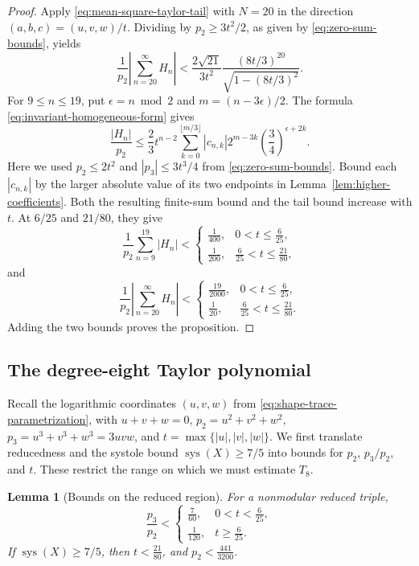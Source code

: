 \documentclass[10pt,twoside]{article}
\theoremstyle{plain}
\newtheorem{lemma}[theorem]{Lemma}
\theoremstyle{definition}
\theoremstyle{remark}
\DeclareMathOperator{\sys}{sys}
\begin{document}
\begin{proof}
Apply \eqref{eq:mean-square-taylor-tail} with $N=20$ in the direction
$(a,b,c)=(u,v,w)/t$. Dividing by $p_2\geq3t^2/2$, as given by
\eqref{eq:zero-sum-bounds}, yields
$$\frac1{p_2}\left|\sum_{n=20}^{\infty}H_n\right|
<\frac{2\sqrt{21}}{3t^2}
\frac{(8t/3)^{20}}{\sqrt{1-(8t/3)^2}}.$$
For $9\leq n\leq19$, put $\epsilon=n\bmod2$ and
$m=(n-3\epsilon)/2$. The formula
\eqref{eq:invariant-homogeneous-form} gives
$$
\frac{|H_n|}{p_2}
\leq\frac23t^{n-2}
\sum_{k=0}^{\lfloor m/3\rfloor}
|c_{n,k}|2^{m-3k}\left(\frac34\right)^{\epsilon+2k}.
$$
Here we used $p_2\leq2t^2$ and
$|p_3|\leq3t^3/4$ from \eqref{eq:zero-sum-bounds}.
Bound each $|c_{n,k}|$ by the larger absolute value of its two
endpoints in Lemma~\ref{lem:higher-coefficients}.
Both the resulting finite-sum bound and the tail bound increase
with $t$. At $6/25$ and $21/80$, they give
$$
\frac1{p_2}\sum_{n=9}^{19}|H_n|<
\begin{cases}
\frac1{400},&0<t\leq\frac6{25},\\
\frac1{200},&\frac6{25}<t\leq\frac{21}{80},
\end{cases}
$$
and
$$
\frac1{p_2}\left|\sum_{n=20}^{\infty}H_n\right|
<
\begin{cases}
\frac{19}{2000},&0<t\leq\frac6{25},\\
\frac1{20},&\frac6{25}<t\leq\frac{21}{80}.
\end{cases}
$$
Adding the two bounds proves the proposition.
\end{proof}

\subsection{The degree-eight Taylor polynomial}
\label{sec:invariant-reduction}
Recall the logarithmic coordinates $(u,v,w)$ from
\eqref{eq:shape-trace-parametrization}, with $u+v+w=0$,
$p_2=u^2+v^2+w^2$, $p_3=u^3+v^3+w^3=3uvw$, and
$t=\max\{|u|,|v|,|w|\}$. We first translate reducedness and the
systole bound $\sys(X)\geq7/5$ into bounds for $p_2$, $p_3/p_2$,
and $t$. These restrict the range on which we must estimate $T_8$.

\begin{lemma}[Bounds on the reduced region]
\label{lem:reduced-invariants}
For a nonmodular reduced triple,
$$
\frac{p_3}{p_2}<
\begin{cases}
\frac7{60},&0<t<\frac6{25},\\
\frac1{120},&t\geq\frac6{25}.
\end{cases}
$$
If $\sys(X)\geq7/5$, then 
$t<\frac{21}{80}$, and
$p_2<\frac{441}{3200}$.
\end{lemma}
\end{document}
